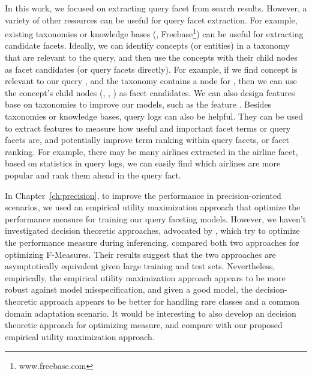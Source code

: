 In this work, we focused on extracting query facet from search results. However, a variety of other resources can be useful for query facet extraction. For example, existing taxonomies or knowledge bases (\eg, Freebase\footnote{www.freebase.com}) can be useful for extracting candidate facets. Ideally, we can identify concepts (or entities) in a taxonomy that are relevant to the query, and then use the concepts with their child nodes as facet candidates (or query facets directly). For example, if we find concept  is relevant to our query , and the taxonomy contains a node for , then we can use the concept's child nodes (, , ) as facet candidates. We can also design features base on taxonomies to improve our models, such as the feature . Besides taxonomies or knowledge bases, query logs can also be helpful. They can be used to extract features to measure how useful and important facet terms or query facets are, and potentially improve term ranking within query facets, or facet ranking. For example, there may be many airlines extracted in the airline facet, based on statistics in query logs, we can easily find which airlines are more popular and rank them ahead in the query fact.

In Chapter~\ref{ch:precision}, to improve the performance in precision-oriented scenarios, we used an empirical utility maximization approach that optimize the performance measure for training our query faceting models. However, we haven't investigated  decision theoretic approaches, advocated by \citet{lewis1995evaluating}, which try to optimize the performance measure during inferencing. \citet{nan2012optimizing} compared both two approaches for optimizing F-Measures. Their results suggest that the two approaches are asymptotically equivalent given large training and test sets. Nevertheless, empirically, the empirical utility maximization approach appears to be more robust against model misspecification, and given a good model, the decision-theoretic approach appears to be better for handling rare classes and a common domain adaptation scenario. It would be interesting to also develop an decision theoretic approach for optimizing \PRF measure, and compare with our proposed empirical utility maximization approach.


